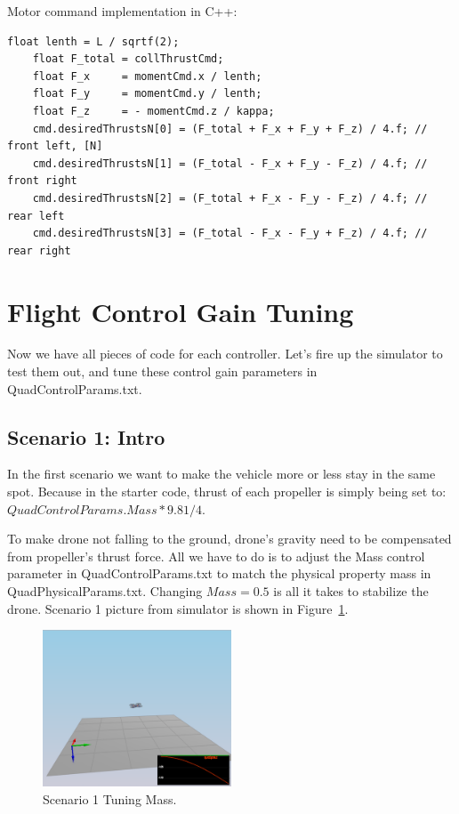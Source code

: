 \documentclass[a4paper]{article}
\begin{document}
Motor command implementation in C++:
\begin{lstlisting}[frame=single]
    float lenth = L / sqrtf(2);
    float F_total = collThrustCmd;
    float F_x     = momentCmd.x / lenth;
    float F_y     = momentCmd.y / lenth;
    float F_z     = - momentCmd.z / kappa;
    cmd.desiredThrustsN[0] = (F_total + F_x + F_y + F_z) / 4.f; // front left, [N]
    cmd.desiredThrustsN[1] = (F_total - F_x + F_y - F_z) / 4.f; // front right
    cmd.desiredThrustsN[2] = (F_total + F_x - F_y - F_z) / 4.f; // rear left
    cmd.desiredThrustsN[3] = (F_total - F_x - F_y + F_z) / 4.f; // rear right
\end{lstlisting}

\section{Flight Control Gain Tuning}

Now we have all pieces of code for each controller. Let's fire up the simulator to test them out, and tune these control gain parameters in QuadControlParams.txt.

\subsection{Scenario 1: Intro}

In the first scenario we want to make the vehicle more or less stay in the same spot. Because in the starter code, thrust of each propeller is simply being set to: $QuadControlParams.Mass*9.81/4$.

To make drone not falling to the ground, drone's gravity need to be compensated from propeller's thrust force. All we have to do is to adjust the Mass control parameter in QuadControlParams.txt to match the physical property mass in QuadPhysicalParams.txt. Changing $Mass = 0.5$ is all it takes to stabilize the drone. Scenario 1 picture from simulator is shown in Figure~\ref{fig:scenario1}.

\begin{figure}[ht]
\centering
\includegraphics[width=0.5\textwidth]{./fig/scenario1.png}
\caption{\label{fig:scenario1} Scenario 1 Tuning Mass.}
\end{figure}
\end{document}
